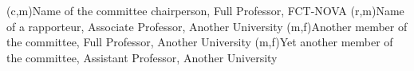 (c,m){Name of the committee chairperson, Full Professor, FCT-NOVA}
(r,m){Name of a rapporteur, Associate Professor, Another University}
(m,f){Another member of the committee, Full Professor, Another University}
(m,f){Yet another member of the committee, Assistant Professor, Another University}
